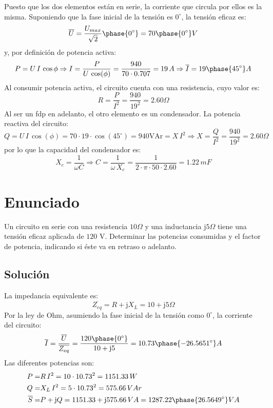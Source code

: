 Puesto que los dos elementos están en serie, la corriente que circula
por ellos es la misma. Suponiendo que la fase inicial de la tensión es
$0^\circ$, la tensión eficaz es:
\begin{equation*}
  \overline{U}=\dfrac{U_{max}}{\sqrt{2}}\phase{0^\circ}=70\phase{0^\circ}V
\end{equation*}
y, por definición de potencia activa:
\begin{equation*}
  P=U\, I\,\cos{\phi}\Rightarrow I=\dfrac{P}{U\,\cos(\phi)}=\dfrac{940}{70\cdot 0.707}=19\,A\Rightarrow \overline{I}=19\phase{45^\circ}A
\end{equation*}
Al consumir potencia activa, el circuito cuenta con una resistencia,
cuyo valor es:
\begin{equation*}
  R=\dfrac{P}{I^2}=\dfrac{940}{19^2}=2.60\Omega
\end{equation*}
Al ser un fdp en adelanto, el otro elemento es un condensador. La
potencia reactiva del circuito:
\begin{equation*}
  Q=U\, I\,\cos({\phi})=70\cdot19\cdot\cos(45^\circ)=940 \text{VAr}=X\,I^2\Rightarrow X=\dfrac{Q}{I^2}=\dfrac{940}{19^2}=2.60\Omega
\end{equation*}
por lo que la capacidad del condensador es:
\begin{equation*}
  X_c=\dfrac{1}{\omega C}\Rightarrow C= \dfrac{1}{\omega\,X_c}=\dfrac{1}{2\cdot\pi\cdot 50\cdot 2.60}=1.22\,mF
\end{equation*}


\section{Enunciado}
Un circuito en serie con una resistencia $10\Omega$ y una inductancia
$\mathrm{j}5\Omega$ tiene una tensión eficaz aplicada de $120$
V. Determinar las potencias consumidas y el factor de potencia,
indicando si éste va en retraso o adelanto.

\subsection*{Solución}

La impedancia equivalente es:
\begin{equation*}
  \overline{Z_{eq}}=R+\mathrm{j}X_L=10+\mathrm{j}5\Omega
\end{equation*}
Por la ley de Ohm, asumiendo la fase inicial de la tensión como
$0^\circ$, la corriente del circuito:
\begin{equation*}
  \overline{I}=\dfrac{\overline{U}}{\overline{Z_{eq}}}=\dfrac{120\phase{0^\circ}}{10+\mathrm{j}5}=10.73\phase{-26.5651^\circ} A
\end{equation*}
Las diferentes potencias son:
\begin{align*}
  P=&R\,I^2=10\cdot 10.73^2=1151.33 \,W\\
  Q=&X_L\,I^2=5\cdot 10.73^2=575.66 \,VAr\\
  \overline{S}=&P+\mathrm{j}Q=1151.33+\mathrm{j}575.66\,VA=1287.22\phase{26.5649^\circ} VA
\end{align*}

